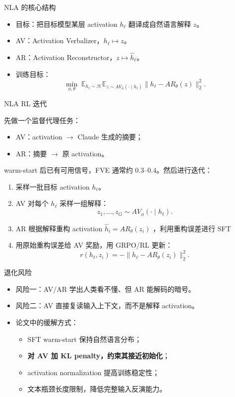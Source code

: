 % 

\begin{frame}{NLA 的核心结构}
\begin{itemize}
  \item 目标：把目标模型某层 activation $h_\ell$ 翻译成自然语言解释 $z$。
  \item AV：Activation Verbalizer，$h_\ell \mapsto z$。
  \item AR：Activation Reconstructor，$z \mapsto \hat h_\ell$。
  \item 训练目标：
  \[
    \min_{\phi,\theta}\;
    \mathbb{E}_{h_\ell \sim \mathcal H}
    \mathbb{E}_{z \sim AV_\phi(\cdot \mid h_\ell)}
    \|h_\ell - AR_\theta(z)\|_2^2 .
  \]
\end{itemize}
\end{frame}

\begin{frame}{NLA RL 迭代}

先做一个监督代理任务：
  \begin{itemize}
    \item AV：activation $\to$ Claude 生成的摘要；
    \item AR：摘要 $\to$ 原 activation。
  \end{itemize}
warm-start 后已有可用信号，FVE 通常约 $0.3$--$0.4$。然后进行迭代：

\begin{enumerate}
  \item 采样一批目标 activation $h_\ell$。
  \item AV 对每个 $h_\ell$ 采样一组解释：
  \[
    z_1,\dots,z_G \sim AV_\phi(\cdot \mid h_\ell).
  \]
  \item AR 根据解释重构 activation $\hat h_i = AR_\theta(z_i)$ ，利用重构误差进行 SFT
  \item 用原始重构误差给 AV 奖励，用 GRPO/RL 更新：
  \[
    r(h_\ell,z_i) = -\|h_\ell - AR_\theta(z_i)\|_2^2.
  \]
\end{enumerate}
\end{frame}

\begin{frame}{退化风险}
\begin{itemize}
  \item 风险一：AV/AR 学出人类看不懂、但 AR 能解码的暗号。
  \item 风险二：AV 直接复读输入上下文，而不是解释 activation。
  \item 论文中的缓解方式：
  \begin{itemize}
    \item SFT warm-start 保持自然语言分布；
    \item \textbf{对 AV 加 KL penalty，约束其接近初始化}；
    \item activation normalization 提高训练稳定性；
    \item 文本瓶颈长度限制，降低完整输入反演能力。
  \end{itemize}
\end{itemize}
\end{frame}
